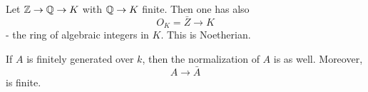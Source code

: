 \begin{example}
  Let $\mathbb Z \to \mathbb Q \to K$ with $\mathbb Q \to K$ finite.
  Then one has also
  \[ O_K = \bar Z \to K\]
  - the ring of algebraic integers in $K$. This is Noetherian.
\end{example}

\begin{theorem}[Nagata]
  If $A$ is finitely generated over $k$, then the normalization of $A$ is as well. Moreover,
  \[ A \to \bar A\]
  is finite.
\end{theorem}


